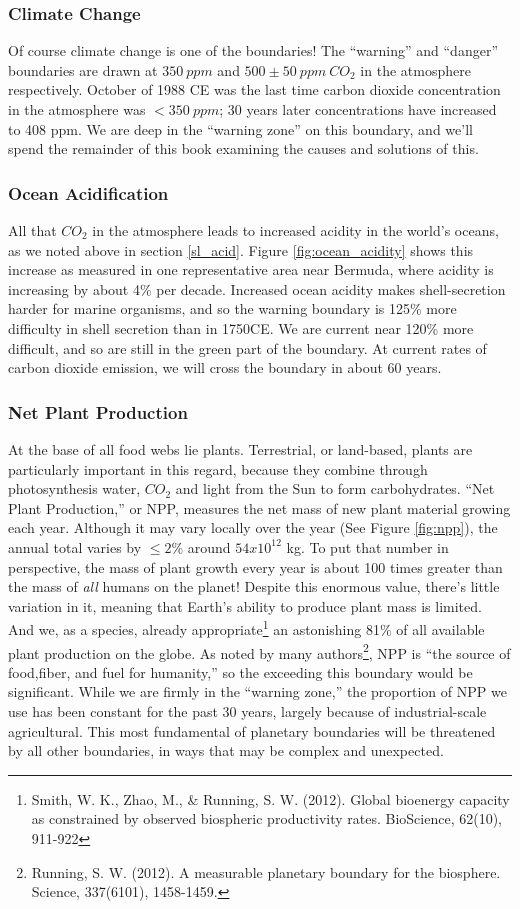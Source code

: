 \documentclass[amstex,12pt]{book}
\begin{document}
\subsubsection{Climate Change}
Of course climate change is one of the boundaries! The ``warning'' and ``danger'' boundaries are drawn at $350\: ppm$ and $500\pm50\:ppm\: CO_2$ in the atmosphere respectively. October of 1988 CE was the last time carbon dioxide concentration in the atmosphere was $<350\: ppm$; 30 years later concentrations have increased to 408 ppm. We are deep in the ``warning zone'' on this boundary, and we'll spend the remainder of this book examining the causes and solutions of this.

\subsubsection{Ocean Acidification}
All that $CO_2$ in the atmosphere leads to increased acidity in the world's oceans, as we noted above in section \ref{sl_acid}. Figure \ref{fig:ocean_acidity} shows this increase as measured in one representative area near Bermuda, where acidity is increasing by about 4\% per decade. Increased ocean acidity makes shell-secretion harder for marine organisms, and so the warning boundary is 125\% more difficulty in shell secretion than in 1750CE. We are current near 120\% more difficult, and so are still in the green part of the boundary. At current rates of carbon dioxide emission, we will cross the boundary in about 60 years.

\subsubsection{Net Plant Production}
At the base of all food webs lie plants. Terrestrial, or land-based, plants are particularly important in this regard, because they combine through photosynthesis water, $CO_2$ and light from the Sun to form carbohydrates. ``Net Plant Production,'' or NPP, measures the net mass of new plant material growing each year. Although it may vary locally over the year (See Figure \ref{fig:npp}), the annual total varies by $\leq2\%$ around $54x10^{12}$ kg. To put that number in perspective, the mass of plant growth every year is about 100 times greater than the mass of \emph{all} humans on the planet! Despite this enormous value, there's little variation in it, meaning that Earth's ability to produce plant mass is limited. And we, as a species, already appropriate\footnote{Smith, W. K., Zhao, M., \& Running, S. W. (2012). Global bioenergy capacity as constrained by observed biospheric productivity rates. BioScience, 62(10), 911-922} an astonishing 81\% of all available plant production on the globe. As noted by many authors\footnote{Running, S. W. (2012). A measurable planetary boundary for the biosphere. Science, 337(6101), 1458-1459.}, NPP is ``the source of food,fiber, and fuel for humanity,'' so the exceeding this boundary would be significant. While we are firmly in the ``warning zone,'' the proportion of NPP we use has been constant for the past 30 years, largely because of industrial-scale agricultural. This most fundamental of planetary boundaries will be threatened by all other boundaries, in ways that may be complex and unexpected. 
\end{document}
